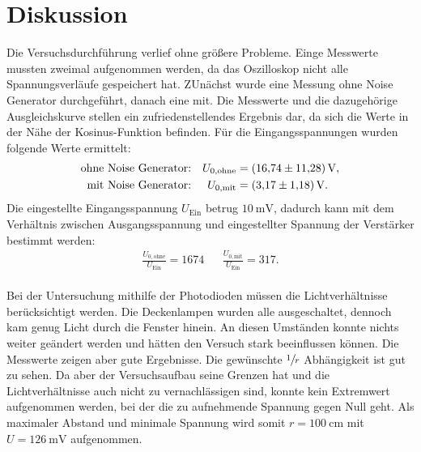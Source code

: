 \section{Diskussion}
\label{sec:Diskussion}

Die Versuchsdurchführung verlief ohne größere Probleme.
Einge Messwerte mussten zweimal aufgenommen werden, da das Oszilloskop nicht alle Spannungsverläufe gespeichert hat.
ZUnächst wurde eine Messung ohne Noise Generator durchgeführt, danach eine mit.
Die Messwerte und die dazugehörige Ausgleichskurve stellen ein zufriedenstellendes Ergebnis dar, da sich die Werte in der Nähe der Kosinus-Funktion befinden.
\noindent
Für die Eingangsspannungen wurden folgende Werte ermittelt:
\begin{align*}
    \text{ohne Noise Generator:}&  &U_{0,\text{ohne}} &= \SI{16.74 \pm 11.28}{\volt}, \\
    \text{mit Noise Generator:}&   &U_{0,\text{mit}}  &= \SI{ 3.17 \pm 1.18}{\volt}.
\end{align*}
Die eingestellte Eingangsspannung $U_\text{Ein}$ betrug $\SI{10}{\milli\volt}$, dadurch kann mit dem Verhältnis zwischen Ausgangsspannung und eingestellter Spannung der Verstärker bestimmt werden:
\begin{align*}
    \frac{U_{0,\text{ohne}}}{U_\text{Ein}} = 1674&  &\frac{U_{0,\text{mit}}}{U_\text{Ein}} = 317 .
\end{align*}
\\
\noindent
Bei der Untersuchung mithilfe der Photodioden müssen die Lichtverhältnisse berücksichtigt werden.
Die Deckenlampen wurden alle ausgeschaltet, dennoch kam genug Licht durch die Fenster hinein.
An diesen Umständen konnte nichts weiter geändert werden und hätten den Versuch stark beeinflussen können.
Die Messwerte zeigen aber gute Ergebnisse.
Die gewünschte $\sfrac{1}{r}$ Abhängigkeit ist gut zu sehen.
Da aber der Versuchsaufbau seine Grenzen hat und die Lichtverhältnisse auch nicht zu vernachlässigen sind,
konnte kein Extremwert aufgenommen werden, bei der die zu aufnehmende Spannung gegen Null geht.
Als maximaler Abstand und minimale Spannung wird somit $r = \SI{100}{\centi\metre}$ mit $U = \SI{126}{\milli\volt}$ aufgenommen.

